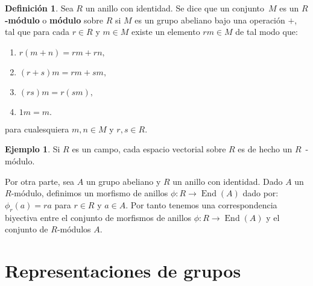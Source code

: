\documentclass[12pt]{book}
\theoremstyle{definition}
\newtheorem{definition}[theorem]{Definición}
\newtheorem{example}[theorem]{Ejemplo}
\DeclareMathOperator{\End}{End}
\newcounter{in}
\newcounter{ini}
\begin{document}
\begin{definition}
  Sea $R$ un anillo con identidad. Se dice que un conjunto~$M$
  es un \textbf{$R$-módulo} o \textbf{módulo} sobre $R$ si $M$ es un grupo abeliano
  bajo una operación $+$, tal que para cada $r\in R$ y $m\in M$ existe
  un elemento $rm\in M$ de tal modo que:
  \begin{enumerate}
  \item $r(m+n)=rm+rn,$
  \item $(r+s)m=rm+sm,$
  \item $(rs)m=r(sm),$
  \item $1m=m.$
  \end{enumerate}
  para cualesquiera $m,n \in M$ y $r,s\in R$.
\end{definition}

\begin{example}
  Si $R$ es un campo, cada espacio vectorial sobre $R$ es de hecho un $R$~-módulo.
\end{example}



Por otra parte, sea $A$ un grupo abeliano y $R$ un anillo con
identidad. Dado $A$ un $R$-módulo, definimos un morfismo
de anillos $\phi:R\rightarrow \End(A)$ dado por: $\phi_{r}(a)=ra$ para
$r\in R$ y $a\in A$. Por tanto tenemos una correspondencia biyectiva entre el conjunto de
morfismos de anillos $\phi:R\rightarrow \End(A)$ y el conjunto de
$R$-módulos $A$.

\section{Representaciones de grupos}
\label{rep-grup}
\end{document}
